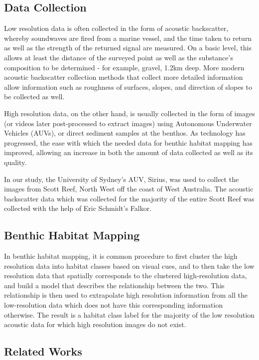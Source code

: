 \documentclass[10pt,sts]{article}
\begin{document}
\begin{multicols}{2}
    \subsection{Data Collection}
    Low resolution data is often collected in the form of acoustic backscatter, whereby soundwaves are fired from a marine vessel, and the time taken to return as well as the strength of the returned signal are measured. On a basic level, this allows at least the distance of the surveyed point as well as the substance's composition to be determined - for example, gravel, 1.2km deep. More modern acoustic backscatter collection methods that collect more detailed information allow information such as roughness of surfaces, slopes, and direction of slopes to be collected as well. 
    
    High resolution data, on the other hand, is usually collected in the form of images (or videos later post-processed to extract images) using Autonomous Underwater Vehicles (AUVs), or direct sediment samples at the benthos. As technology has progressed, the ease with which the needed data for benthic habitat mapping has improved, allowing an increase in both the amount of data collected as well as its quality. 
    
    In our study, the University of Sydney's AUV, Sirius, was used to collect the images from Scott Reef, North West off the coast of West Australia. The acoustic backscatter data which was collected for the majority of the entire Scott Reef was collected with the help of Eric Schmidt's Falkor.

    \subsection{Benthic Habitat Mapping}

    In benthic habitat mapping, it is common procedure to first cluster the high resolution data into habitat classes based on visual cues, and to then take the low resolution data that spatially corresponds to the clustered high-resolution data, and build a model that describes the relationship between the two. This relationship is then used to extrapolate high resolution information from all the low-resolution data which does not have this corresponding information otherwise. The result is a habitat class label for the majority of the low resolution acoustic data for which high resolution images do not exist. 

    \subsection{Related Works}


\end{multicols}
\end{document}
